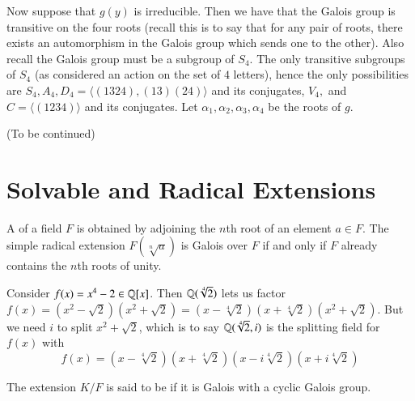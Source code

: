 Now suppose that $g(y)$ is irreducible. Then we have that the Galois group is transitive on the four roots (recall this is to say that for any pair of roots, there exists an automorphism in the Galois group which sends one to the other). Also recall the Galois group must be a subgroup of $S_4$. The only transitive subgroups of $S_4$ (as considered an action on the set of $4$ letters), hence the only possibilities are $S_4, A_4, D_4 = \langle (1324),(13)(24)\rangle$ and its conjugates, $V_4,$ and $C = \langle (1234)\rangle$ and its conjugates. Let $\alpha_1,\alpha_2,\alpha_3,\alpha_4$ be the roots of $g$. 

(To be continued)



\section{ Solvable and Radical Extensions}


\begin{definition}
    A  of a field $F$ is obtained by adjoining the $n$th root of an element $a \in F$. The simple radical extension $F(\sqrt[n]{a})$ is Galois over $F$ if and only if $F$ already contains the $n$th roots of unity.
\end{definition}

\begin{example}
    Consider $f(x) = x^4 - 2 \in \mathbb Q[x]$. Then $\mathbb Q(\sqrt[4]{2})$ lets us factor $f(x) = (x^2-\sqrt{2})(x^2+\sqrt{2}) = (x-\sqrt[4]{2})(x+\sqrt[4]{2})(x^2+\sqrt{2})$. But we need $i$ to split $x^2+\sqrt{2}$, which is to say $\mathbb Q(\sqrt[4]{2},i)$ is the splitting field for $f(x)$ with \begin{equation*}
        f(x) = (x-\sqrt[4]{2})(x+\sqrt[4]{2})(x-i\sqrt[4]{2})(x+i\sqrt[4]{2})
    \end{equation*}
\end{example}

\begin{definition}
    The extension $K/F$ is said to be  if it is Galois with a cyclic Galois group.
\end{definition}


